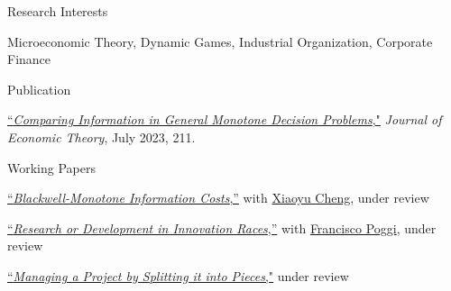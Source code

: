\medskip



\begin{rSection}{Research Interests}
	
	Microeconomic Theory, 
	Dynamic Games, 
	Industrial Organization,
	Corporate Finance
	
\end{rSection}



\medskip


\begin{rSection}{Publication}
	
	\begin{etaremune}
		\item \href{https://yonggyun-yg-kim.github.io/files/Research%20papers/GMDP_JET.pdf}{``\textit{Comparing Information in General Monotone Decision Problems},"} 
		\textit{Journal of Economic Theory}, July 2023, 211. 
		
	\end{etaremune}
	
	
	
\end{rSection}

\begin{rSection}{Working Papers}
	
	\begin{etaremune}
		
		\item \href{https://arxiv.org/pdf/2404.15158.pdf}{``\textit{Blackwell-Monotone Information Costs},''} with \href{https://xiaoyu-cheng.com/}{Xiaoyu Cheng}, under review
		
		\item \href{https://yonggyun-yg-kim.github.io/files/Research%20papers/RDIR.pdf}{``\textit{Research or Development in Innovation Races},''}   with \href{https://www.franciscopoggi.com/}{Francisco Poggi}, under review
		
		\item \href{https://yonggyun-yg-kim.github.io/files/Research%20papers/Managing%20a%20Project%20by%20Splitting%20it%20into%20Pieces.pdf}{``\textit{Managing a Project by Splitting it into Pieces},"} under review
		
	\end{etaremune}
	
	
\end{rSection}




